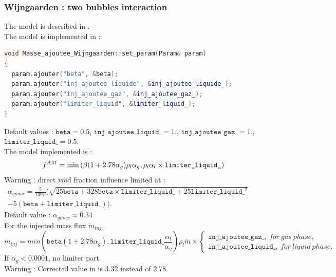 \subsubsection{Wijngaarden : two bubbles interaction}
The model is described in \textcite{Biesheuvel1984}.\\
The model is implemented in :
\begin{lstlisting}[language=c++]
void Masse_ajoutee_Wijngaarden::set_param(Param& param)
{
  param.ajouter("beta", &beta);
  param.ajouter("inj_ajoutee_liquide", &inj_ajoutee_liquide_);
  param.ajouter("inj_ajoutee_gaz", &inj_ajoutee_gaz_);
  param.ajouter("limiter_liquid", &limiter_liquid_);
}
\end{lstlisting}
Default values : $\texttt{beta}=0.5$, $\texttt{inj\_ajoutee\_liquid\_}=1.$, $\texttt{inj\_ajoutee\_gaz\_}=1.$, $\texttt{limiter\_liquid\_} = 0.5$.\\
The model implemented is :
\begin{equation}
   f^{AM}=\min\left( \beta(1+2.78\alpha_g) \rho_l\alpha_g,\rho_l\alpha_l\times{}\texttt{limiter\_liquid\_} \right)
\end{equation}
{\color{red} Warning} : direct void fraction influence limited at :
\begin{equation}
\begin{aligned}
    \alpha_{gmax}=\frac{5}{139\beta}(\sqrt{25\texttt{beta}+328\texttt{beta} \times \texttt{limiter\_liquid\_}+25 \texttt{limiter\_liquid\_}^2} & & \\ -5(\texttt{beta}+\texttt{limiter\_liquid\_})).
\end{aligned}
\end{equation}
Default value : $\alpha_{gmax}\approx 0.34$\\
For the injected mass flux $\dot{m}_{inj}$,
\begin{equation}
   \dot{m}_{inj}=min(\texttt{beta}(1+2.78\alpha_g),\texttt{limiter\_liquid\_}\frac{\alpha_l}{\alpha_g}) \rho_l\dot{m}\times\begin{cases} \texttt{inj\_ajoutee\_gaz\_},\ for\ gas\ phase,\\ \texttt{inj\_ajoutee\_liquid\_},\ for\ liquid\ phase.
   \end{cases}
\end{equation}
If $\alpha_g< 0.0001$, no limiter part.\\
{\color{red} Warning} : Corrected value in \textcite{Biesheuvel1984} is 3.32 instead of 2.78.

%
